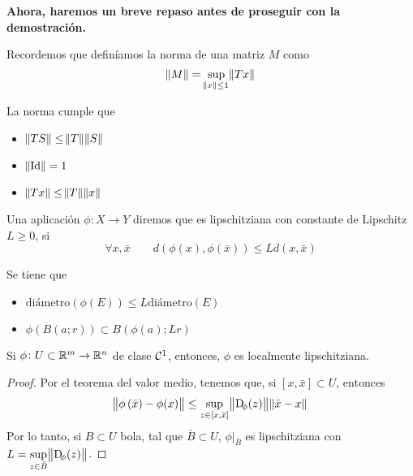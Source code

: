 \textbf{Ahora, haremos un breve repaso antes de proseguir con la demostración.}

\begin{defi*}
    Recordemos que definíamos la norma de una matriz $M$ como
    \[
        \norm{M} = \sup_{\norm{x} \leq 1} \norm{T x}
    \]
\end{defi*}

\begin{prop*}
    La norma cumple que
    \begin{itemize}
        \item $\norm{TS} \leq \norm{T}\norm{S}$
        \item $\norm{\operatorname{Id}} = 1$
        \item $\norm{Tx} \leq \norm{T} \norm{x}$
    \end{itemize}
\end{prop*}

\begin{defi*}
    Una aplicación $\phi \colon X \to Y$ diremos que es lipschitziana con constante de Lipschitz $L \geq 0$, si
    \[
        \forall x, \bar{x} \qquad
        d\left( \phi(x), \phi\left( \bar{x} \right) \right) \leq L d\left( x, \bar{x} \right)
    \]
\end{defi*}

\begin{obs*}
    Se tiene que
    \begin{itemize}
        \item $\text{diámetro}\left( \phi(E) \right) \leq L \text{diámetro}(E)$
        \item $\phi\left( B(a; r) \right) \subset B\left( \phi(a); Lr \right)$
    \end{itemize}
\end{obs*}

\begin{prop*}
    Si $\phi \colon U \subset \mathbb{R}^m \to \mathbb{R}^n$ de clase $\mathcal{C}^1$, entonces, $\phi$ es localmente lipschitziana.
\end{prop*}

\begin{proof}
    Por el teorema del valor medio, tenemos que, si $[x, \bar{x}] \subset U$, entonces
    \[
        \norm{\phi\left( \bar{x} \right) - \phi(x)} \leq \sup_{z \in [x, \bar{x}]} \norm{\Dif_\phi(z)} \norm{\bar{x} - x} 
    \]
    Por lo tanto, si $B \subset U$ bola, tal que $\bar{B} \subset U$, $\phi\vert_{\bar{B}}$ es lipschitziana con $L = \sup\limits_{z \in \bar{B}} \norm{\Dif_\phi(z)}$.
\end{proof}

